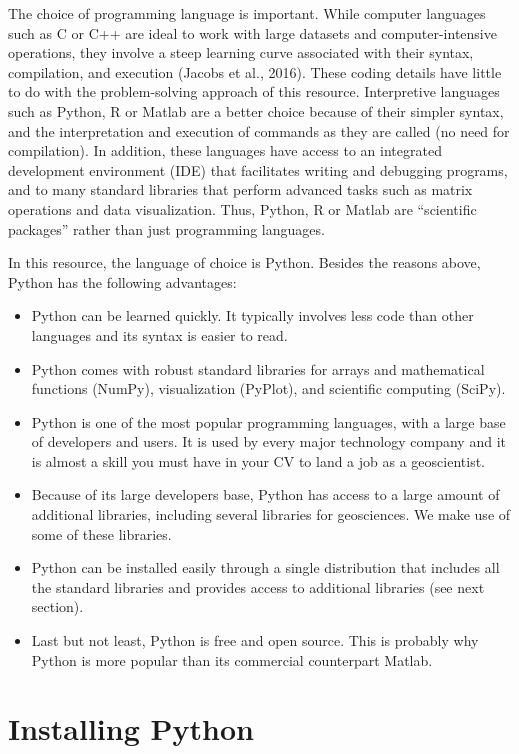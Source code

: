 \documentclass[a4paper , 12pt]{book}
\begin{document}
The choice of programming language is important. While computer languages such as C or C++ are ideal to work with large datasets and computer-intensive operations, they involve a steep learning curve associated with their syntax, compilation, and execution (Jacobs et al., 2016). These coding details have little to do with the problem-solving approach of this resource. Interpretive languages such as Python, R or Matlab are a better choice because of their simpler syntax, and the interpretation and execution of commands as they are called (no need for compilation). In addition, these languages have access to an integrated development environment (IDE) that facilitates writing and debugging programs, and to many standard libraries that perform advanced tasks such as matrix operations and data visualization. Thus, Python, R or Matlab are “scientific packages” rather than just programming languages.

In this resource, the language of choice is Python. Besides the reasons above, Python has the following advantages:
\begin{itemize}
  \item Python can be learned quickly. It typically involves less code than other languages and its syntax is easier to read.
  \item Python comes with robust standard libraries for arrays and mathematical functions (NumPy), visualization (PyPlot), and scientific computing (SciPy).
  \item Python is one of the most popular programming languages, with a large base of developers and users. It is used by every major technology company and it is almost a skill you must have in your CV to land a job as a geoscientist.
  \item Because of its large developers base, Python has access to a large amount of additional libraries, including several libraries for geosciences. We make use of some of these libraries.
  \item Python can be installed easily through a single distribution that includes all the standard libraries and provides access to additional libraries (see next section).
  \item Last but not least, Python is free and open source. This is probably why Python is more popular than its commercial counterpart Matlab.
\end{itemize}

\section{Installing Python}
\end{document}
